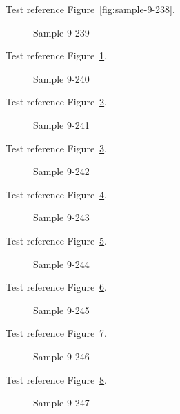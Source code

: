 Test reference Figure~\ref{fig:sample-9-238}.

\begin{figure}[tbhp]
\caption{Sample 9-239}
\label{fig:sample-9-239}
\end{figure}

Test reference Figure~\ref{fig:sample-9-239}.

\begin{figure}[tbhp]
\caption{Sample 9-240}
\label{fig:sample-9-240}
\end{figure}

Test reference Figure~\ref{fig:sample-9-240}.

\begin{figure}[tbhp]
\caption{Sample 9-241}
\label{fig:sample-9-241}
\end{figure}

Test reference Figure~\ref{fig:sample-9-241}.

\begin{figure}[tbhp]
\caption{Sample 9-242}
\label{fig:sample-9-242}
\end{figure}

Test reference Figure~\ref{fig:sample-9-242}.

\begin{figure}[tbhp]
\caption{Sample 9-243}
\label{fig:sample-9-243}
\end{figure}

Test reference Figure~\ref{fig:sample-9-243}.

\begin{figure}[tbhp]
\caption{Sample 9-244}
\label{fig:sample-9-244}
\end{figure}

Test reference Figure~\ref{fig:sample-9-244}.

\begin{figure}[tbhp]
\caption{Sample 9-245}
\label{fig:sample-9-245}
\end{figure}

Test reference Figure~\ref{fig:sample-9-245}.

\begin{figure}[tbhp]
\caption{Sample 9-246}
\label{fig:sample-9-246}
\end{figure}

Test reference Figure~\ref{fig:sample-9-246}.

\begin{figure}[tbhp]
\caption{Sample 9-247}
\label{fig:sample-9-247}
\end{figure}

